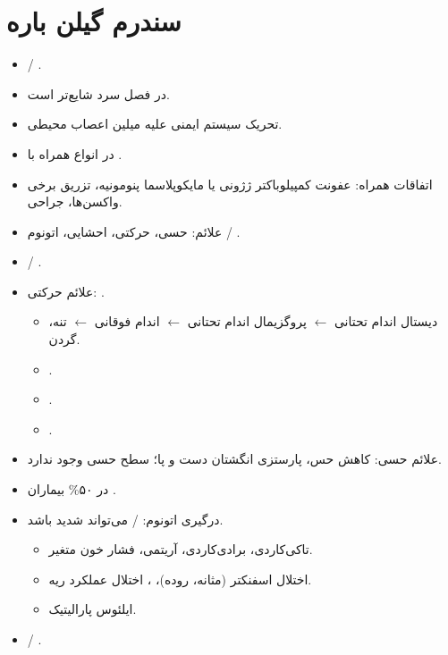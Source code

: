 \documentclass[a4paper,12pt]{extbook}
\begin{document}
\section*{سندرم گیلن باره}
\begin{itemize}
\item {} / .
\item در فصل سرد شایع‌تر است.
\item تحریک سیستم ایمنی علیه میلین اعصاب محیطی.
\item {} در انواع همراه با .
\item اتفاقات همراه: عفونت کمپیلوباکتر ژژونی یا مایکوپلاسما پنومونیه، تزریق برخی واکسن‌ها، جراحی.
\item علائم: حسی، حرکتی، احشایی، اتونوم / .
\item {} / .
\item علائم حرکتی: .
\begin{itemize}
\item دیستال اندام تحتانی $\longleftarrow$ پروگزیمال اندام تحتانی $\longleftarrow$ اندام فوقانی $\longleftarrow$ تنه، گردن.
\item {}.
\item {}.
\item {}.
\end{itemize}
\item علائم حسی: کاهش حس، پارستزی انگشتان دست و پا؛ سطح حسی وجود ندارد.
\item در ۵۰\% بیماران .
\item درگیری اتونوم:  / می‌تواند شدید باشد.
\begin{itemize}
\item تاکی‌کاردی، برادی‌کاردی، آریتمی، فشار خون متغیر.
\item اختلال اسفنکتر (مثانه، روده)، ، اختلال عملکرد ریه.
\item ایلئوس پارالیتیک.
\end{itemize}
\item {} / .
\end{itemize}

\end{document}
